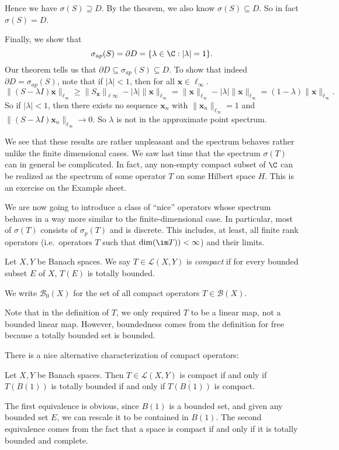 \documentclass[a4paper]{article}
\begin{document}
\begin{eg}
  Hence we have $\sigma(S) \supseteq D$. By the theorem, we also know $\sigma(S) \subseteq D$. So in fact $\sigma(S) = D$.

  Finally, we show that
  \[
    \sigma_{ap}(S) = \partial D = \{\lambda \in \C: |\lambda| = 1\}.
  \]
  Our theorem tells us that $\partial D \subseteq \sigma_{ap}(S) \subseteq D$. To show that indeed $\partial D = \sigma_{ap}(S)$, note that if $|\lambda| < 1$, then for all $\mathbf{x} \in \ell_\infty$.
  \[
    \|(S - \lambda I)\mathbf{x}\|_{\ell_\infty} \geq \|S_\mathbf{x}\|_{\ell\infty} - |\lambda|\|\mathbf{x}\|_{\ell_\infty} = \|\mathbf{x}\|_{\ell_\infty} - |\lambda| \|\mathbf{x}\|_{\ell_\infty} = (1 - \lambda) \|\mathbf{x}\|_{\ell_\infty}.
  \]
  So if $|\lambda| < 1$, then there exists no sequence $\mathbf{x}_n$ with $\|\mathbf{x}_n\|_{\ell_\infty} = 1$ and $\|(S - \lambda I) \mathbf{x}_n \|_{\ell_\infty} \to 0$. So $\lambda$ is not in the approximate point spectrum.
\end{eg}
We see that these results are rather unpleasant and the spectrum behaves rather unlike the finite dimensional cases. We saw last time that the spectrum $\sigma(T)$ can in general be complicated. In fact, any non-empty compact subset of $\C$ can be realized as the spectrum of some operator $T$ on some Hilbert space $H$. This is an exercise on the Example sheet.

We are now going to introduce a class of ``nice'' operators whose spectrum behaves in a way more similar to the finite-dimensional case. In particular, most of $\sigma(T)$ consists of $\sigma_p(T)$ and is discrete. This includes, at least, all finite rank operators (i.e.\ operators $T$ such that $\dim (\im T)) < \infty$) and their limits.

\begin{defi}
  Let $X, Y$ be Banach spaces. We say $T \in \mathcal{L}(X, Y)$ is \emph{compact} if for every bounded subset $E$ of $X$, $T(E)$ is totally bounded.

  We write $\mathcal{B}_0(X)$ for the set of all compact operators $T \in \mathcal{B}(X)$.
\end{defi}
Note that in the definition of $T$, we only required $T$ to be a linear map, not a bounded linear map. However, boundedness comes from the definition for free because a totally bounded set is bounded.

There is a nice alternative characterization of compact operators:
\begin{prop}
  Let $X, Y$ be Banach spaces. Then $T \in \mathcal{L}(X, Y)$ is compact if and only if $T(B(1))$ is totally bounded if and only if $\overline{T(B(1))}$ is compact.
\end{prop}
The first equivalence is obvious, since $B(1)$ is a bounded set, and given any bounded set $E$, we can rescale it to be contained in $B(1)$. The second equivalence comes from the fact that a space is compact if and only if it is totally bounded and complete.
\end{document}
